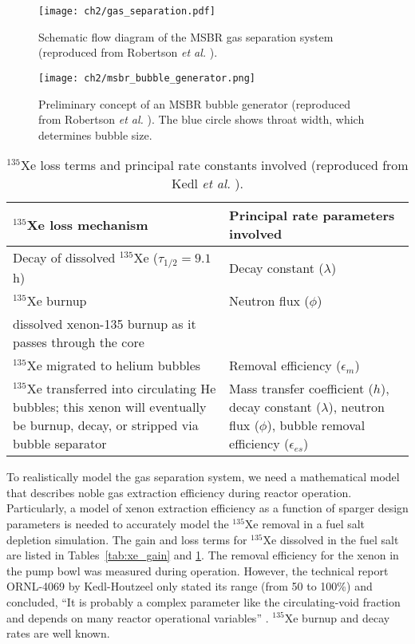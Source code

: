 \begin{figure}[htp!] %
	\centering
	\texttt{[image: ch2/gas\_separation.pdf]}
	\caption{Schematic flow diagram of the \gls{MSBR} gas separation system 
		(reproduced from Robertson \emph{et al.} 
		\cite{robertson_conceptual_1971}).}
	\label{fig:gas_removal_system}
\end{figure}
\begin{figure}[htp!] %
	\centering
	\texttt{[image: ch2/msbr\_bubble\_generator.png]}
	\caption{Preliminary concept of an \gls{MSBR} bubble generator (reproduced 
	from Robertson \emph{et al.} \cite{robertson_conceptual_1971}). 
	The blue circle shows throat width, which determines bubble size.}
	\vspace{-0.25in}
	\label{fig:bubble_separator}
\end{figure}
\begin{table}[t]
	\caption{$^{135}$Xe loss terms and principal rate constants involved
		(reproduced from Kedl \emph{et al.} \cite{kedl_development_1967}).}
	\centering
	\begin{tabularx}{\textwidth}{b b}
		\hline \textbf{$^{135}$Xe loss mechanism}      & \textbf{Principal 
			rate parameters involved}  	\\[5pt]
		\hline Decay of dissolved $^{135}$Xe ($\tau_{1/2}=9.1$ h)  & Decay 
		constant	($\lambda$)		\\[5pt]
		\hline $^{135}$Xe burnup              &  Neutron flux 
		($\phi$)		 					\\[5pt]
		dissolved xenon-135 burnup as it passes through the core  
		& 			            \\		
		\hline $^{135}$Xe migrated to 
		helium bubbles & Removal efficiency 
		($\epsilon_m$)		\\[5pt]
		\hline $^{135}$Xe transferred into circulating He bubbles; this xenon 
		will eventually be burnup, decay, or stripped via bubble separator & 
		Mass transfer coefficient ($h$), decay constant ($\lambda$), 
		neutron flux ($\phi$), bubble removal efficiency 
		($\epsilon_{es}$)		\\[5pt]
		\hline 
	\end{tabularx}
	\label{tab:xe_loss}
\end{table}

To realistically model the gas separation system, we need a mathematical model 
that describes noble gas extraction efficiency during reactor operation. 
Particularly, a model of xenon extraction efficiency as a function of sparger 
design parameters is needed to accurately model the $^{135}$Xe removal in a 
fuel salt depletion simulation. The gain and loss terms for $^{135}$Xe 
dissolved in the fuel salt are listed in Tables~\ref{tab:xe_gain} and 
\ref{tab:xe_loss}. The removal efficiency for the xenon in the pump bowl was 
measured during  operation. However, the technical report 
ORNL-4069 by Kedl-Houtzeel only stated its range (from 50 to 100\%) and 
concluded, ``It is probably a complex parameter like the circulating-void 
fraction and depends on many reactor operational variables'' 
\cite{kedl_development_1967}. $^{135}$Xe burnup and decay rates are well 
known. 

